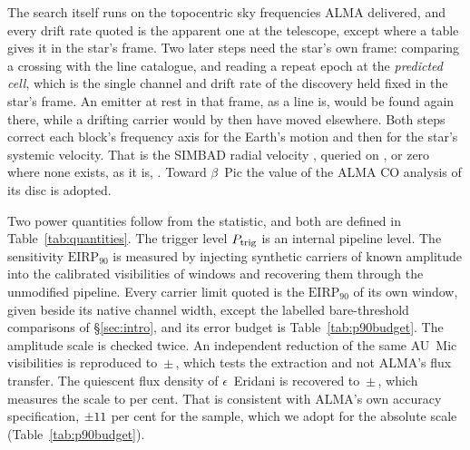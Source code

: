 The search itself runs on the topocentric sky frequencies ALMA delivered, and
every drift rate quoted is the apparent one at the telescope, except where a
table gives it in the star's frame. Two later steps
need the star's own frame: comparing a crossing with the line catalogue, and
reading a repeat epoch at the \emph{predicted cell}, which is the single
channel and drift rate of the discovery held fixed in the star's frame. An
emitter at rest in that frame, as a line is, would be found again there,
while a drifting carrier would by then have moved elsewhere. Both steps
correct each block's frequency axis for the Earth's motion and then for the
star's systemic velocity. That is the SIMBAD radial velocity \citep{SIMBAD2000},
queried on \SimbadQueryDate, or zero where none exists, as it is,
\FrZeroVsysClause. Toward $\beta$~Pic the value of the ALMA CO analysis of
its disc \citep{Matra2017} is adopted.

Two power quantities follow from the statistic, and both are defined in
Table~\ref{tab:quantities}. The trigger level $P_{\rm trig}$ is an internal
pipeline level. The sensitivity $\mathrm{EIRP}_{90}$ is measured by injecting
synthetic carriers of known amplitude into the calibrated visibilities of
\SensNInj{} windows and recovering them through the unmodified pipeline.
Every carrier limit quoted is the $\mathrm{EIRP}_{90}$ of its own window,
given beside its native channel width, except the labelled bare-threshold
comparisons of \S\ref{sec:intro}, and its error budget is
Table~\ref{tab:p90budget}. The
amplitude scale is checked twice. An independent reduction of the same
AU~Mic visibilities is reproduced to \PxJanRatio\,$\pm$\,\PxJanRatioErr,
which tests the extraction and not ALMA's flux transfer. The quiescent flux
density of $\epsilon$~Eridani \citep{Burton2022} is recovered to
\PxEpsRatio\,$\pm$\,\PxEpsRatioErr, which measures the scale to \SbEpsPct{}
per cent. That is consistent with ALMA's own accuracy specification,
$\pm11$ per cent for the sample, which we adopt for the absolute scale
(Table~\ref{tab:p90budget}).

